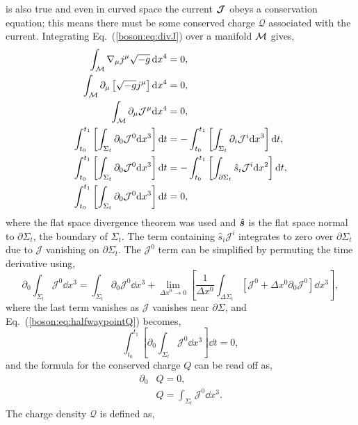 is also true and even in curved space the current $\boldsymbol{\mathcal{J}}$ obeys a conservation equation; this means there must be some conserved charge $\mathcal{Q}$ associated with the current. Integrating Eq.~(\ref{boson:eq:divJ}) over a manifold $\mathcal{M}$ gives,
\begin{align}
\int_{\mathcal{M}} \nabla_\mu j^\mu \sqrt{-g}\,\dd x^4 &= 0 ,\\
\int_{\mathcal{M}} \partial_\mu \left[\sqrt{-g} j^{\mu} \right] \dd x^4 &=0,\\
 \int_{\mathcal{M}}\partial_\mu \mathcal{J}^\mu \dd x^4&=0, \\ 
 \int^{t_1}_{t_0}\left[\int_{\Sigma_t} \partial_0 \mathcal{J}^0 \dd x^3 \right]\dd t &= -\int^{t_1}_{t_0}\left[\int_{\Sigma_t} \partial_i \mathcal{J}^i \dd x^3 \right]\dd t , \\
  \int^{t_1}_{t_0}\left[\int_{\Sigma_t} \partial_0 \mathcal{J}^0 \dd x^3 \right]\dd t &= -\int^{t_1}_{t_0}\left[\int_{\partial \Sigma_t} \hat{s}_i \mathcal{J}^i \dd x^2 \right]\dd t , \\
\int^{t_1}_{t_0}\left[\int_{\Sigma_t} \partial_0 \mathcal{J}^0 \dd x^3 \right]\dd t &= 0 \label{boson:eq:halfwaypointQ} ,
\end{align}
where the flat space divergence theorem was used and $\hat{\boldsymbol{s}}$ is the flat space normal to $\partial \Sigma_t$, the boundary of $\Sigma_t$. The term containing $\hat{s}_i\mathcal{J}^i$ integrates to zero over $\partial \Sigma_t$ due to $\mathcal{J}$ vanishing on $\partial \Sigma_t$. The $\mathcal{J}^0$ term can be simplified by permuting the time derivative using,
\begin{equation} 
\partial_0 \int_{\Sigma_t}\mathcal{J}^0 \dd x^3 = \int_{\Sigma_t}\partial_0 \mathcal{J}^0 \dd x^3 + \lim_{\Delta x^0\rightarrow0}\left[ \frac{1}{\Delta x^0}\int_{\Delta \Sigma_t}\left[ \mathcal{J}^0 +\Delta x^0 \partial_0 \mathcal{J}^0\right] \dd x^3 \right],
\end{equation}
where the last term vanishes as $\mathcal{J}$ vanishes near $\partial\Sigma$, and Eq.~(\ref{boson:eq:halfwaypointQ}) becomes,
\begin{equation} 
\int^{t_1}_{t_0}\left[\partial_0 \int_{\Sigma_t} \mathcal{J}^0 \dd x^3 \right]\dd t = 0,
\end{equation} 
and the formula for the conserved charge $Q$ can be read off as,
\begin{align} 
\partial_0 &Q=0,\\
&Q = \int_{\Sigma_t}\mathcal{J}^0 \dd x^3 .
\end{align}
The charge density $\mathcal{Q}$ is defined as, 
